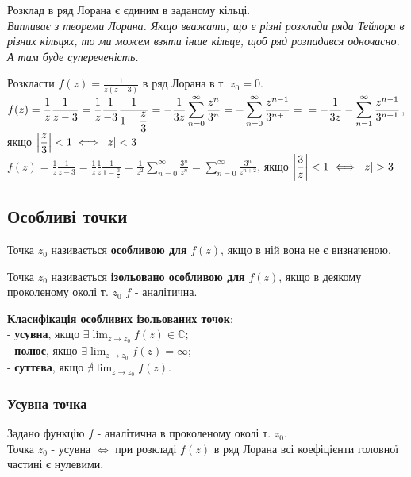 \documentclass{math_library}
\begin{document}
\begin{theorem}
Розклад в ряд Лорана є єдиним в заданому кільці.\\
\textit{Випливає з теореми Лорана. Якщо вважати, що є різні розклади ряда Тейлора в різних кільцях, то ми можем взяти інше кільце, щоб ряд розпадався одночасно. А там буде супереченість.}
\end{theorem}

\begin{theorem}
Розкласти $\displaystyle f(z)=\frac{1}{z(z-3)}$ в ряд Лорана в т. $z_0 = 0$.\\
	 $f(z) =  \displaystyle \frac{1}{z} \frac{1}{z-3} = \frac{1}{z} \frac{1}{-3} \frac{1}{1-\displaystyle\frac{z}{3}} = -\frac{1}{3z} \sum_{n=0}^{\infty} \frac{z^n}{3^n} = -\sum_{n=0}^{\infty} \frac{z^{n-1}}{3^{n+1}} = \\= -\frac{1}{3z} - \sum_{n=1}^{\infty} \frac{z^{n-1}}{3^{n+1}}$, якщо $\displaystyle \abs{\frac{z}{3}} <1 \iff \abs{z} < 3 $\\
	 $f(z) = \displaystyle \frac{1}{z} \frac{1}{z-3} = \frac{1}{z} \frac{1}{z} \frac{1}{1-\displaystyle\frac{3}{z}} = \frac{1}{z^2} \sum_{n=0}^{\infty} \frac{3^n}{z^n} = \sum_{n=0}^{\infty} \frac{3^n}{z^{n+2}}$, якщо $\displaystyle \abs{\frac{3}{z}}<1 \iff \abs{z}>3$
\end{theorem}
	 
\subsection{Особливі точки}
\begin{definition}
Точка $z_0$ називається \textbf{особливою для} $f(z)$, якщо в ній вона не є визначеною.
\end{definition}

\begin{definition}
Точка $z_0$ називається \textbf{ізольовано особливою для} $f(z)$, якщо в деякому проколеному околі т. $z_0$ $f$ - аналітична.
\end{definition}

\textbf{Класифікація особливих ізольованих точок}:\\
	 - \textbf{усувна}, якщо $\displaystyle\exists \lim_{z \to z_0} f(z) \in \mathbb{C}$;\\
	 - \textbf{полюс}, якщо $\displaystyle\exists \lim_{z \to z_0} f(z) = \infty$;\\
	 - \textbf{суттєва}, якщо $\displaystyle \nexists \lim_{z \to z_0} f(z)$.
	 
\subsubsection{Усувна точка}
\begin{theorem}
Задано функцію $f$ - аналітична в проколеному околі т. $z_0$.\\
Точка $z_0$ - усувна $\iff$ при розкладі $f(z)$ в ряд Лорана всі коефіцієнти головної частині є нулевими.
\end{theorem}
\end{document}
